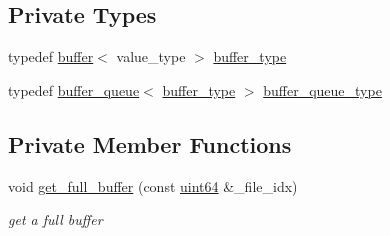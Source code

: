 \subsection*{Private Types}
\begin{DoxyCompactItemize}
\item 
typedef \hyperlink{structbuffer}{buffer}$<$ value\+\_\+type $>$ \hyperlink{classasync__multi__stream__reader_ad58ad834dc6d741a12be1fb442b8e5d6}{buffer\+\_\+type}
\item 
typedef \hyperlink{structbuffer__queue}{buffer\+\_\+queue}$<$ \hyperlink{classasync__multi__stream__reader_ad58ad834dc6d741a12be1fb442b8e5d6}{buffer\+\_\+type} $>$ \hyperlink{classasync__multi__stream__reader_a0bf4b801f7d874da5cbbe5c6504d0ecc}{buffer\+\_\+queue\+\_\+type}
\end{DoxyCompactItemize}
\subsection*{Private Member Functions}
\begin{DoxyCompactItemize}
\item 
void \hyperlink{classasync__multi__stream__reader_afae17e2365e9ed10f30d398a550caa89}{get\+\_\+full\+\_\+buffer} (const \hyperlink{types_8h_a60e8696a4678cd348e991a1f172e53f7}{uint64} \&\+\_\+file\+\_\+idx)
\begin{DoxyCompactList}\small\item\em get a full buffer \end{DoxyCompactList}\end{DoxyCompactItemize}
